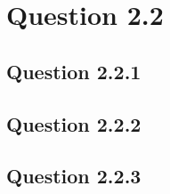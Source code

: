 \section*{Question 2.2}

\subsection*{Question 2.2.1}


\subsection*{Question 2.2.2}


\subsection*{Question 2.2.3}

	
	
